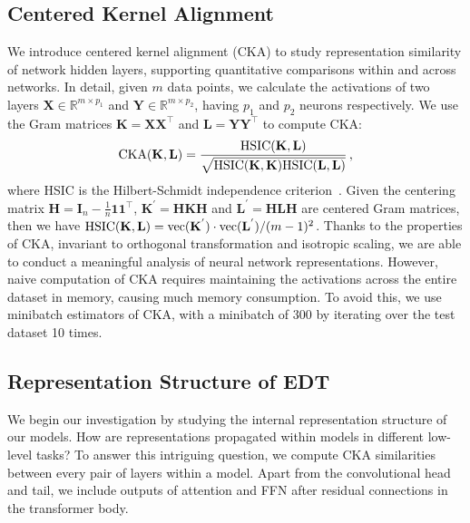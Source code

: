 \documentclass[runningheads]{llncs}
\begin{document}
	\subsection{Centered Kernel Alignment}
	\label{sec:preparation}
	We introduce centered kernel alignment (CKA)\cite{kornblith2019better,cortes2012algorithms,raghu2021vision} to study representation similarity of network hidden layers, supporting quantitative comparisons within and across networks. In detail, given $m$ data points, we calculate the activations of two layers $\mathbf{X} \in \mathbb{R}^{m \times p_{1}}$ and $ \mathbf{Y} \in \mathbb{R}^{m \times p_{2}}$, having $p_{1}$ and $p_{2}$ neurons respectively. We use the Gram matrices $\mathbf{K}=\mathbf{X}\mathbf{X}^\top$ and $\mathbf{L}=\mathbf{Y}\mathbf{Y}^\top$ to compute CKA:
	\begin{equation}\label{1}
	{\rm CKA} (\mathbf{K}, \mathbf{L}) =\frac{{\rm HSIC} (\mathbf{K}, \mathbf{L})}{\sqrt{ {\rm HSIC}(\mathbf{K}, \mathbf{K}) {\rm HSIC}(\mathbf{L}, \mathbf{L})}} \,,
	\end{equation}
	where HSIC is the Hilbert-Schmidt independence criterion~\cite{gretton2007kernel}. Given the centering matrix $\mathbf{H}=\mathbf{I}_{n}-\frac{1}{n}\mathbf{1}\mathbf{1}^\top$, $\mathbf{K}^{'}=\mathbf{H}\mathbf{K}\mathbf{H}$ and $\mathbf{L}^{'}=\mathbf{H}\mathbf{L}\mathbf{H}$ are centered Gram matrices, then we have ${\rm HSIC}(\mathbf{K}, \mathbf{L}) = {\rm vec}(\mathbf{K}^{'}) \cdot {\rm vec}(\mathbf{L}^{'})/(m-1)^{2}$. Thanks to the properties of CKA, invariant to orthogonal transformation and isotropic scaling, we are able to conduct a meaningful analysis of neural network representations.  However, naive computation of CKA requires maintaining the activations across the entire dataset in memory, causing much memory consumption. To avoid this, we use minibatch estimators of CKA\cite{nguyen2020wide}, with a minibatch of 300 by iterating over the test dataset 10 times.
	
	\subsection{Representation Structure of EDT}
\label{sec:finetune}
	
	We begin our investigation by studying the internal representation structure of our models. How are representations propagated within models in different low-level tasks?  To answer this intriguing question, we compute CKA similarities between every pair of layers within a model. Apart from the convolutional head and tail, we include outputs of attention and FFN after residual connections in the transformer body.
	
\end{document}
